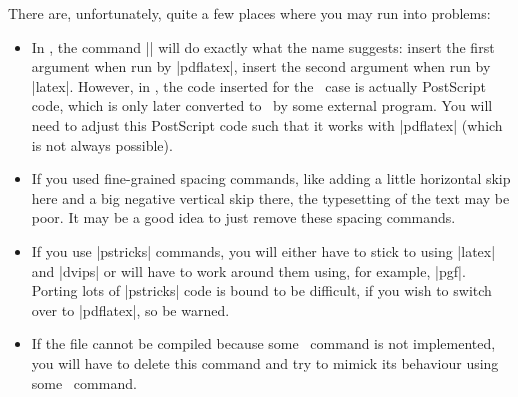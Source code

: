 There are, unfortunately, quite a few places where you may run into problems:
\begin{itemize}
  \item
  In \beamer, the command |\PDForPS| will do exactly what the name suggests: insert the first argument when run by |pdflatex|, insert the second argument when run by |latex|. However, in \prosper, the code inserted for the \pdf\ case is actually PostScript code, which is only later converted to \pdf\ by some external program. You will need to adjust this PostScript code such that it works with |pdflatex| (which is not always possible).
  \item
  If you used fine-grained spacing commands, like adding a little horizontal skip   here and a big negative vertical skip there, the typesetting of the text may be poor. It may be a good idea to just remove these spacing commands.
  \item
  If you use |pstricks| commands, you will either have to stick to using |latex| and |dvips| or will have to work around them using, for example, |pgf|. Porting lots of |pstricks| code is bound to be difficult, if you wish to switch over to |pdflatex|, so be warned.
  \item
  If the file cannot be compiled because some \prosper\ command is not implemented, you will have to delete this command and try to mimick its behaviour using some \beamer\ command.
\end{itemize}

